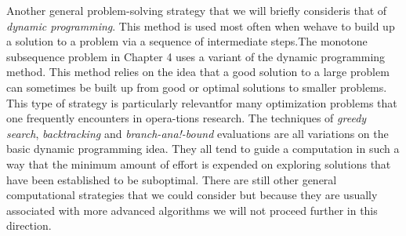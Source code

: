 \documentclass{book}
\begin{document}
	Another general problem-solving strategy that we will briefly consideris that of \textit{dynamic programming}. This method is used most often when wehave to build up a solution to a problem via a sequence of intermediate steps.The monotone subsequence problem in Chapter 4 uses a variant of the dynamic programming method. This method relies on the idea that a good solution to a large problem can sometimes be built up from good or optimal solutions to smaller problems. This type of strategy is particularly relevantfor many optimization problems that one frequently encounters in opera-tions research. The techniques of \textit{greedy search}, \textit{backtracking} and \textit{branch-ana!-bound} evaluations are all variations on the basic dynamic programming idea. They all tend to guide a computation in such a way that the minimum amount of effort is expended on exploring solutions that have been established to be suboptimal. There are still other general computational strategies that we could consider but because they are usually associated with more advanced algorithms we will not proceed further in this direction.
\end{document}

